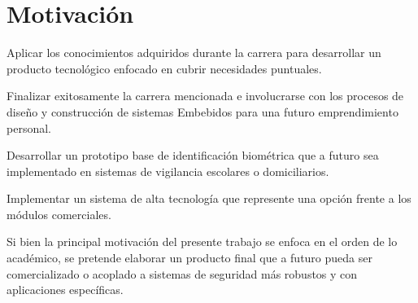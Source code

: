 
\section{Motivación}

Aplicar los conocimientos adquiridos durante la carrera para desarrollar un producto tecnológico enfocado en cubrir necesidades puntuales.

Finalizar exitosamente la carrera mencionada e involucrarse con los procesos de diseño y construcción de sistemas Embebidos para una futuro emprendimiento personal. 

Desarrollar un prototipo base de identificación biométrica que a futuro sea implementado en sistemas de vigilancia escolares o domiciliarios.

Implementar un sistema de alta tecnología que represente una opción frente a los módulos comerciales.

Si bien la principal motivación del presente trabajo se enfoca en el orden de lo académico, se pretende elaborar un producto final que a futuro pueda ser comercializado o acoplado a sistemas de seguridad más robustos y con aplicaciones específicas.







